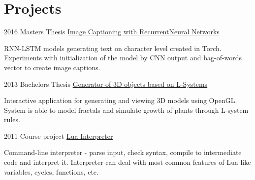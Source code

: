 \documentclass{tccv}
\begin{document}
\section{Projects}

\begin{eventlist}
	
	\item{2016}
	{Masters Thesis}
	{\href{https://github.com/kvitajakub/MasterThesis}{Image Captioning with Recurrent\newline Neural Networks}}
	
	RNN-LSTM models generating text on character level created in Torch. Experiments with initialization of the model by CNN output and bag-of-words vector to create image captions. 
	
	\item{2013}
	{Bachelors Thesis}
	{\href{https://github.com/kvitajakub/LSystemModeller}{Generator of 3D objects based on L-Systems}}
	
	Interactive application for generating and viewing 3D models using OpenGL. System is able to model fractals and simulate growth of plants through L-system rules.
	
	\item{2011}
	{Course project}
	{\href{https://github.com/kvitajakub/interpreterLua}{Lua Interpreter}}
	
	Command-line interpreter - parse input, check syntax, compile to intermediate code and interpret it. Interpreter can deal with most common features of Lua like variables, cycles, functions, etc.
	
\end{eventlist}
\end{document}
